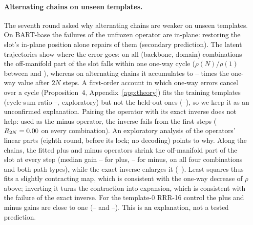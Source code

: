 \paragraph{Alternating chains on unseen templates.}
The seventh round asked why alternating chains are weaker on unseen templates. On BART-base the failures of the unfrozen operator are
in-plane: restoring the slot's in-plane position alone repairs \CLfifteenRAbartPush{} of them (secondary prediction). The latent
trajectories show where the error goes: on all \CLsixteenCombos{} (backbone, domain) combinations the off-manifold part of the slot falls
within one one-way cycle ($\rho(N)/\rho(1)$ between \CLsixteenNOneMin{} and \CLsixteenNOneMax{}), whereas on alternating chains it
accumulates to \CLsixteenAltMin{}--\CLsixteenAltMax{} times the one-way value after $2N$ steps. A first-order account in which one-way
errors cancel over a cycle (Proposition~4, Appendix~\ref{app:theory}) fits the training templates (cycle-sum ratio
\CLsixteenCycDevMin{}--\CLsixteenCycDevMax{}, exploratory) but not the held-out ones (\CLsixteenCycMin{}--\CLsixteenCycMax{}), so we
keep it as an unconfirmed explanation. Pairing the operator with its exact inverse does not help: used as the minus operator, the
inverse fails from the first steps ($R_{2N} = 0.00{}$ on every combination).
An exploratory analysis of the operators' linear parts (eighth round, before its lock; no decoding) points to why. Along the chains, the
fitted plus and minus operators shrink the off-manifold part of the slot at every step (median gain \CLeoneSlotPLo{}--\CLeoneSlotPHi{}
for plus, \CLeoneSlotMLo{}--\CLeoneSlotMHi{} for minus, on all four combinations and both path types), while the exact inverse
enlarges it (\CLeoneSlotPinvLo{}--\CLeoneSlotPinvHi{}). Least squares thus fits a slightly contracting map, which is consistent with
the one-way decrease of $\rho$ above; inverting it turns the contraction into expansion, which is consistent with the failure of the
exact inverse. For the template-0 RRR-16 control the plus and minus gains are close to one (\CLeoneCtlPLo{}--\CLeoneCtlPHi{} and
\CLeoneCtlMLo{}--\CLeoneCtlMHi{}). This is an explanation, not a tested prediction.

